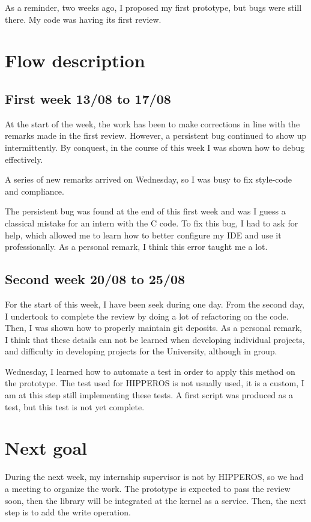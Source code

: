 \documentclass[12pt]{article}
\begin{document}
As a reminder, two weeks ago, I proposed my first prototype, but 
bugs were still there. My code was having its first review.

\section{Flow description}
\subsection{First week 13/08 to 17/08}
At the start of the week, the work has been to make corrections 
in line with the remarks made in the first review. 
However, a persistent bug continued to show up intermittently. 
By conquest, in the course of this week I was shown how to debug effectively.

A series of new remarks arrived on Wednesday, so 
I was busy to fix style-code and compliance.

The persistent bug was found at the end of this first week and was I guess a 
classical mistake for an intern with the C code. 
To fix this bug, I had to ask for help, which allowed me to learn how to 
better configure my IDE and use it professionally. 
As a personal remark, I think this error taught me a lot.

\subsection{Second week 20/08 to 25/08}
For the start of this week, I have been seek during one day.
From the second day, I undertook to complete the review by doing 
a lot of refactoring on the code. Then, I was shown how to properly 
maintain git deposits. 
As a personal remark, I think that these details can not be learned 
when developing individual projects, and difficulty in developing projects 
for the University, although in group.

Wednesday, I learned how to automate a test in order to apply this method on 
the prototype. The test used for HIPPEROS is not usually used, it is a custom, 
I am at this step still implementing these tests.
A first script was produced as a test, but this test is not yet complete.

\section{Next goal}
During the next week, my internship supervisor is not by HIPPEROS, so we 
had a meeting to organize the work. 
The prototype is expected to pass the review soon, then the library will be 
integrated at the kernel as a service. Then, the next step is to add 
the write operation.
\end{document}
